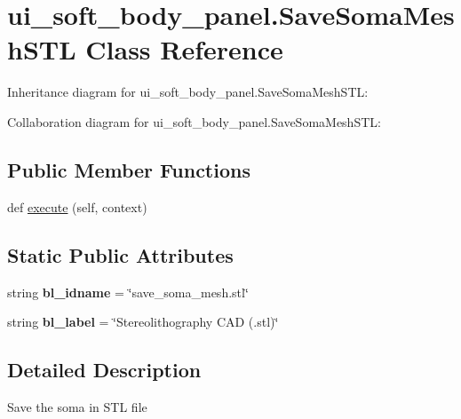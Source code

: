 \hypertarget{classui__soft__body__panel_1_1SaveSomaMeshSTL}{}\section{ui\+\_\+soft\+\_\+body\+\_\+panel.\+Save\+Soma\+Mesh\+S\+TL Class Reference}
\label{classui__soft__body__panel_1_1SaveSomaMeshSTL}


Inheritance diagram for ui\+\_\+soft\+\_\+body\+\_\+panel.\+Save\+Soma\+Mesh\+S\+TL\+:


Collaboration diagram for ui\+\_\+soft\+\_\+body\+\_\+panel.\+Save\+Soma\+Mesh\+S\+TL\+:
\subsection*{Public Member Functions}
\begin{DoxyCompactItemize}
\item 
def \hyperlink{classui__soft__body__panel_1_1SaveSomaMeshSTL_ab906b64cce857fa6b96f17f0c60a6d28}{execute} (self, context)
\end{DoxyCompactItemize}
\subsection*{Static Public Attributes}
\begin{DoxyCompactItemize}
\item 
string {\bfseries bl\+\_\+idname} = \char`\"{}save\+\_\+soma\+\_\+mesh.\+stl\char`\"{}\hypertarget{classui__soft__body__panel_1_1SaveSomaMeshSTL_a8189c954c462c027d6bf5473522cfd35}{}\label{classui__soft__body__panel_1_1SaveSomaMeshSTL_a8189c954c462c027d6bf5473522cfd35}

\item 
string {\bfseries bl\+\_\+label} = \char`\"{}Stereolithography C\+AD (.stl)\char`\"{}\hypertarget{classui__soft__body__panel_1_1SaveSomaMeshSTL_a58ed92dd54399ea4443ada113cbf312f}{}\label{classui__soft__body__panel_1_1SaveSomaMeshSTL_a58ed92dd54399ea4443ada113cbf312f}

\end{DoxyCompactItemize}


\subsection{Detailed Description}
\begin{DoxyVerb}Save the soma in STL file\end{DoxyVerb}
 

